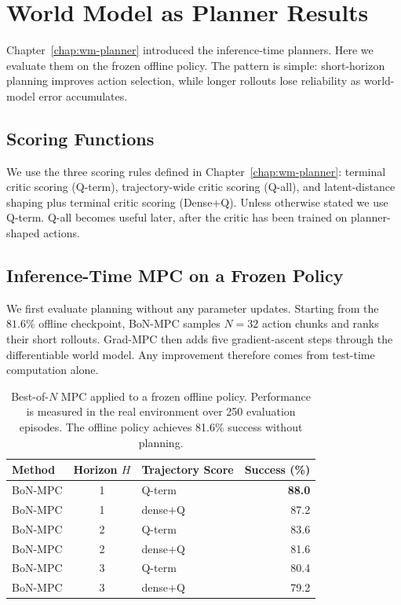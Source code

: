 \section{World Model as Planner Results}
\label{sec:exp-mpc}

Chapter~\ref{chap:wm-planner} introduced the inference-time planners.
Here we evaluate them on the frozen offline policy. The pattern is
simple: short-horizon planning improves action selection, while longer
rollouts lose reliability as world-model error accumulates.

\subsection{Scoring Functions}
\label{sec:exp-scoring}

We use the three scoring rules defined in
Chapter~\ref{chap:wm-planner}: terminal critic scoring (Q-term),
trajectory-wide critic scoring (Q-all), and latent-distance shaping plus
terminal critic scoring (Dense+Q). Unless otherwise stated we use
Q-term. Q-all becomes useful later, after the critic has been trained on
planner-shaped actions.

\subsection{Inference-Time MPC on a Frozen Policy}
\label{sec:exp-mpc-frozen}

We first evaluate planning without any parameter updates. Starting from
the $81.6\%$ offline checkpoint, BoN-MPC samples $N=32$ action chunks
and ranks their short rollouts. Grad-MPC then adds five gradient-ascent
steps through the differentiable world model. Any improvement therefore
comes from test-time computation alone.

\begin{table}[h]
\centering
\caption{Best-of-$N$ MPC applied to a frozen offline policy.
Performance is measured in the real environment over 250 evaluation
episodes. The offline policy achieves 81.6\% success without planning.}
\label{tab:mpc-bon}
\begin{tabular}{l c l r}
\toprule
Method & Horizon $H$ & Trajectory Score & Success (\%) \\
\midrule
BoN-MPC                 & 1 & Q-term    & \textbf{88.0} \\
BoN-MPC                 & 1 & dense$+$Q & 87.2 \\
BoN-MPC                 & 2 & Q-term    & 83.6 \\
BoN-MPC                 & 2 & dense$+$Q & 81.6 \\
BoN-MPC                 & 3 & Q-term    & 80.4 \\
BoN-MPC                 & 3 & dense$+$Q & 79.2 \\
\bottomrule
\end{tabular}
\end{table}

